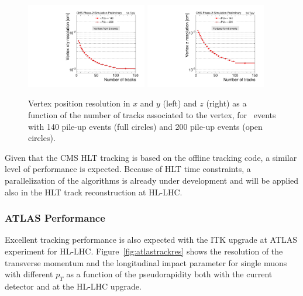 \begin{figure}[h!tbp]
\begin{center}
  \includegraphics[width=0.47\textwidth]{figures/cmsupgrade/TDR-17-001_fig6_13_a_RecoAllAssoc2GenMatched_ResolX_vs_NumTracks_Sigma_PU.pdf} \hfill
  \includegraphics[width=0.47\textwidth]{figures/cmsupgrade/TDR-17-001_fig6_13_b_RecoAllAssoc2GenMatched_ResolZ_vs_NumTracks_Sigma_PU.pdf}
  \caption{Vertex position resolution in $x$ and $y$ (left) and $z$ (right) as a function of the number of tracks associated to the vertex, for \ttbar~events with 140 pile-up events (full circles) and 200 pile-up events (open circles). 
 }
  \label{fig:cmsvertex}
\end{center}
\end{figure}

Given that the CMS HLT tracking is based on the offline tracking code, a similar level of performance is expected.
Because of HLT time constraints, a parallelization of the algorithms is already under development and will be applied also in the HLT track reconstruction at HL-LHC.

\subsubsection{ATLAS Performance}

Excellent tracking performance is also expected with the ITK upgrade at ATLAS experiment for HL-LHC.
Figure~\ref{fig:atlastrackres} shows the resolution of the transverse momentum and the longitudinal impact parameter
for single muons with different $p_T$ as a function of the pseudorapidity both with the current
detector and at the HL-LHC upgrade. 

